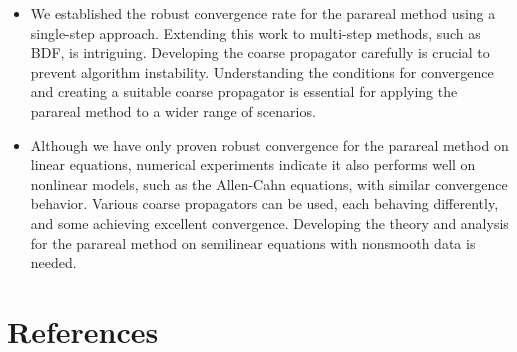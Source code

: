 \documentclass[a4paper, oneside]{book}
\begin{document}
\begin{itemize}
    \item[5.] We established the robust convergence rate for the parareal method using a single-step approach. Extending this work to multi-step methods, such as BDF, is intriguing. Developing the coarse propagator carefully is crucial to prevent algorithm instability. Understanding the conditions for convergence and creating a suitable coarse propagator is essential for applying the parareal method to a wider range of scenarios.
    \item[6.] Although we have only proven robust convergence for the parareal method on linear equations, numerical experiments indicate it also performs well on nonlinear models, such as the Allen-Cahn equations, with similar convergence behavior. Various coarse propagators can be used, each behaving differently, and some achieving excellent convergence. Developing the theory and analysis for the parareal method on semilinear equations with nonsmooth data is needed. 
\end{itemize}




\chapter*{References}

\printbibliography[heading = none]
\end{document}
